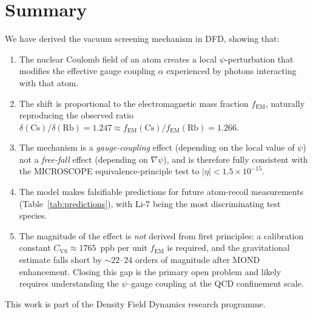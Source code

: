 \documentclass[aps,prd,twocolumn,superscriptaddress,nofootinbib]{revtex4-2}
\newcommand{\ee}[1]{\times 10^{#1}}
\newcommand{\fEM}{f_{\mathrm{EM}}}
\begin{document}
\section{Summary}
\label{sec:summary}

We have derived the vacuum screening mechanism in DFD, showing that:

\begin{enumerate}
\item The nuclear Coulomb field of an atom creates a local
$\psi$-perturbation that modifies the effective gauge coupling
$\alpha$ experienced by photons interacting with that atom.

\item The shift is proportional to the electromagnetic mass fraction
$\fEM$, naturally reproducing the observed ratio
$\delta(\mathrm{Cs})/\delta(\mathrm{Rb}) = 1.247 \approx
\fEM(\mathrm{Cs})/\fEM(\mathrm{Rb}) = 1.266$.

\item The mechanism is a \emph{gauge-coupling} effect (depending on
the local value of $\psi$) not a \emph{free-fall} effect (depending on
$\nabla\psi$), and is therefore fully consistent with the MICROSCOPE
equivalence-principle test to $|\eta| < 1.5\ee{-15}$.

\item The model makes falsifiable predictions for future atom-recoil
measurements (Table~\ref{tab:predictions}), with Li-7 being the most
discriminating test species.

\item The magnitude of the effect is \emph{not} derived from first
principles: a calibration constant $C_{\mathrm{VS}} \approx 1765$~ppb
per unit $\fEM$ is required, and the gravitational estimate falls
short by $\sim\!22$--$24$ orders of magnitude after MOND enhancement.
Closing this gap is the primary open problem and likely requires
understanding the $\psi$--gauge coupling at the QCD confinement scale.
\end{enumerate}

\begin{acknowledgments}
This work is part of the Density Field Dynamics research programme.
\end{acknowledgments}
\end{document}
